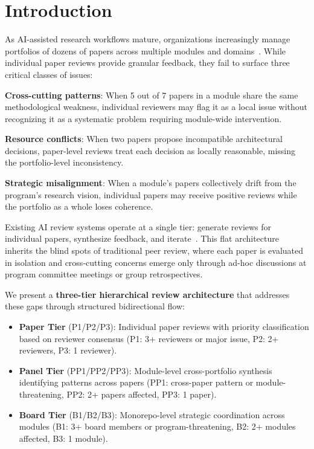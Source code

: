 \section{Introduction}

As AI-assisted research workflows mature, organizations increasingly manage portfolios of dozens of papers across multiple modules and domains~\cite{dellalibera2026review}. While individual paper reviews provide granular feedback, they fail to surface three critical classes of issues:

\textbf{Cross-cutting patterns}: When 5 out of 7 papers in a module share the same methodological weakness, individual reviewers may flag it as a local issue without recognizing it as a systematic problem requiring module-wide intervention.

\textbf{Resource conflicts}: When two papers propose incompatible architectural decisions, paper-level reviews treat each decision as locally reasonable, missing the portfolio-level inconsistency.

\textbf{Strategic misalignment}: When a module's papers collectively drift from the program's research vision, individual papers may receive positive reviews while the portfolio as a whole loses coherence.

Existing AI review systems operate at a single tier: generate reviews for individual papers, synthesize feedback, and iterate~\cite{dellalibera2026synthesis}. This flat architecture inherits the blind spots of traditional peer review, where each paper is evaluated in isolation and cross-cutting concerns emerge only through ad-hoc discussions at program committee meetings or group retrospectives.

We present a \textbf{three-tier hierarchical review architecture} that addresses these gaps through structured bidirectional flow:

\begin{itemize}
\item \textbf{Paper Tier} (P1/P2/P3): Individual paper reviews with priority classification based on reviewer consensus (P1: 3+ reviewers or major issue, P2: 2+ reviewers, P3: 1 reviewer).

\item \textbf{Panel Tier} (PP1/PP2/PP3): Module-level cross-portfolio synthesis identifying patterns across papers (PP1: cross-paper pattern or module-threatening, PP2: 2+ papers affected, PP3: 1 paper).

\item \textbf{Board Tier} (B1/B2/B3): Monorepo-level strategic coordination across modules (B1: 3+ board members or program-threatening, B2: 2+ modules affected, B3: 1 module).
\end{itemize}

